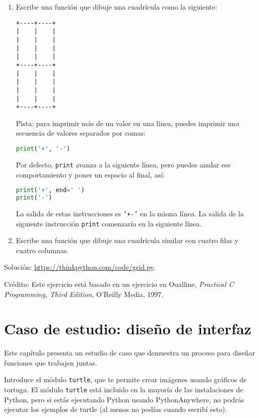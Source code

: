 \documentclass[12pt,letterpaper]{book}
\begin{document}
\begin{enumerate}
\item Escribe una función que dibuje una cuadrícula como la siguiente:

\begin{lstlisting}
+----+----+
|    |    |
|    |    |
|    |    |
|    |    |
+----+----+
|    |    |
|    |    |
|    |    |
|    |    |
+----+----+
\end{lstlisting}

Pista: para imprimir más de un valor en una línea, puedes imprimir una secuencia de valores separados por comas:

\begin{lstlisting}[language=Python]
print('+', '-')
\end{lstlisting}

Por defecto, \texttt{print} avanza a la siguiente línea, pero puedes anular ese comportamiento y poner un espacio al final, así:

\begin{lstlisting}[language=Python]
print('+', end=' ')
print('-')
\end{lstlisting}

La salida de estas instrucciones es \texttt{'+-'} en la misma línea. La salida de la siguiente instrucción \texttt{print} comenzaría en la siguiente línea.

\item Escribe una función que dibuje una cuadrícula similar con cuatro filas y cuatro columnas.
\end{enumerate}

Solución: \href{https://thinkpython.com/code/grid.py}{https://thinkpython.com/code/grid.py}.

Crédito: Este ejercicio está basado en un ejercicio en Oualline, \textit{Practical C Programming, Third Edition}, O'Reilly Media, 1997.






\chapter{Caso de estudio: diseño de interfaz}

Este capítulo presenta un estudio de caso que demuestra un proceso para diseñar funciones que trabajen juntas.

Introduce el módulo \texttt{turtle}, que te permite crear imágenes usando gráficos de tortuga. El módulo \texttt{turtle} está incluido en la mayoría de las instalaciones de Python, pero si estás ejecutando Python usando PythonAnywhere, no podrás ejecutar los ejemplos de turtle (al menos no podías cuando escribí esto).
\end{document}
